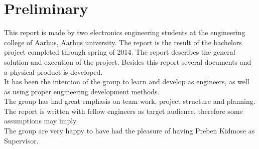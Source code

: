 \chapter{Preliminary}

This report is made by two electronics engineering students at the engineering college of Aarhus, Aarhus university. The report is the result of the bachelors project completed through spring of 2014. The report describes the general solution and execution of the project. Besides this report several documents and a physical product is developed.\\
It has been the intention of the group to learn and develop as engineers, as well as using proper engineering development methods.\\
The group has had great emphasis on team work, project structure and planning.\\
The report is written with fellow engineers as target audience, therefore some assumptions may imply.\\
The group are very happy to have had the pleasure of having Preben Kidmose as Supervisor.\\

